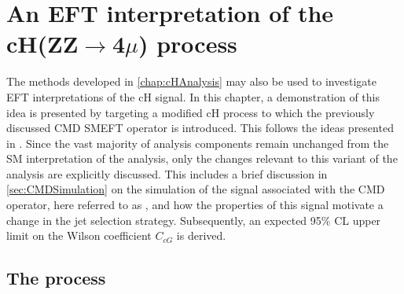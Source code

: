 \chapter{An EFT interpretation of the cH(ZZ$\rightarrow$4$\mu$) process}
\label{chap:EFTAnalysis}
The methods developed in \autoref{chap:cHAnalysis} may also be used to investigate EFT interpretations of the cH signal. In this chapter, a demonstration of this idea is presented by targeting a modified cH process to which the previously discussed CMD SMEFT operator is introduced. This follows the ideas presented in \cite{PhenoPaper}. Since the vast majority of analysis components remain unchanged from the SM interpretation of the \cHZZ analysis, only the changes relevant to this variant of the analysis are explicitly discussed. This includes a brief discussion in \autoref{sec:CMDSimulation} on the simulation of the signal associated with the CMD operator, here referred to as \cHZZCMD, and how the properties of this signal motivate a change in the jet selection strategy. Subsequently, an expected 95\% CL upper limit on the Wilson coefficient $C_{cG}$ is derived.

\section{The \cHZZCMD process}
\label{sec:CMDSimulation}
